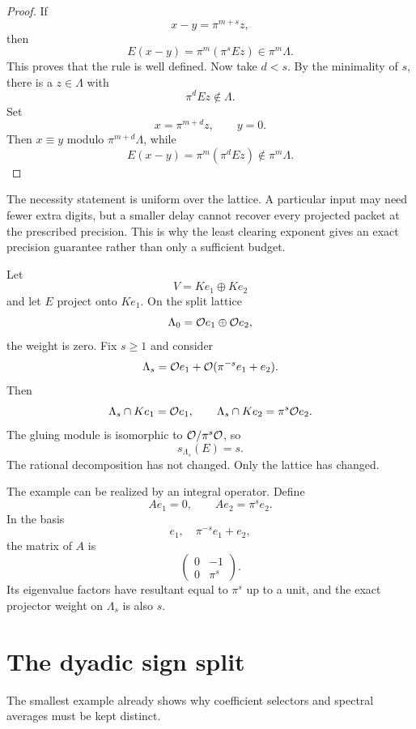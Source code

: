 \begin{proof}
If
\[
x-y=\pi^{m+s}z,
\]
then
\[
E(x-y)=\pi^m(\pi^sEz)\in\pi^m\Lambda.
\]
This proves that the rule is well defined.  Now take $d<s$.  By the minimality of $s$, there is a $z\in\Lambda$ with
\[
\pi^dEz\notin\Lambda.
\]
Set
\[
x=\pi^{m+d}z,
\qquad
y=0.
\]
Then $x\equiv y$ modulo $\pi^{m+d}\Lambda$, while
\[
E(x-y)=\pi^m(\pi^dEz)\notin\pi^m\Lambda.
\]
\end{proof}

\begin{keyidea}
The necessity statement is uniform over the lattice. A particular input may need fewer extra digits, but a smaller delay cannot recover every projected packet at the prescribed precision. This is why the least clearing exponent gives an exact precision guarantee rather than only a sufficient budget.
\end{keyidea}

\begin{example}\label{ex:lattice_dependence}
Let
\[
V=Ke_1\oplus Ke_2
\]
and let $E$ project onto $Ke_1$.  On the split lattice
\[
\Lambda_0={\mathcal O} e_1\oplus{\mathcal O} e_2,
\]
the weight is zero.  Fix $s\geq1$ and consider
\[
\Lambda_s
=
{\mathcal O} e_1+
{\mathcal O}(\pi^{-s}e_1+e_2).
\]
Then
\[
\Lambda_s\cap Ke_1={\mathcal O} e_1,
\qquad
\Lambda_s\cap Ke_2=\pi^s{\mathcal O} e_2.
\]
The gluing module is isomorphic to ${\mathcal O}/\pi^s{\mathcal O}$, so
\[
s_{\Lambda_s}(E)=s.
\]
The rational decomposition has not changed.  Only the lattice has changed.
\end{example}

The example can be realized by an integral operator.  Define
\[
Ae_1=0,
\qquad
Ae_2=\pi^se_2.
\]
In the basis
\[
e_1,
\quad
\pi^{-s}e_1+e_2,
\]
the matrix of $A$ is
\[
\begin{pmatrix}
0&-1\\
0&\pi^s
\end{pmatrix}.
\]
Its eigenvalue factors have resultant equal to $\pi^s$ up to a unit, and the exact projector weight on $\Lambda_s$ is also $s$.

\section{The dyadic sign split}\label{sec:dyadic}

The smallest example already shows why coefficient selectors and spectral averages must be kept distinct.

